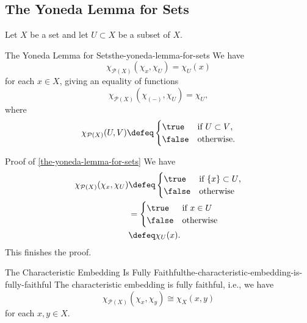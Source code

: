 \subsection{The Yoneda Lemma for Sets}\label{subsection-the-yoneda-lemma-for-sets}
Let $X$ be a set and let $U\subset X$ be a subset of $X$.%
\begin{proposition}{The Yoneda Lemma for Sets}{the-yoneda-lemma-for-sets}%
    We have
    \[
        \chi_{\mathcal{P}(X)}(\chi_{x},\chi_{U})%
        =%
        \chi_{U}(x)%
    \]%
    for each $x\in X$, giving an equality of functions
    \[
        \chi_{\mathcal{P}(X)}(\chi_{(-)},\chi_{U})%
        =%
        \chi_{U},%
    \]%
    where
    \[
        \chi_{\mathcal{P}(X)}(U,V)%
        \defeq%
        \begin{cases}
            \true  &\text{if $U\subset V$,}\\
            \false &\text{otherwise.}
        \end{cases}
    \]%
\end{proposition}
\begin{Proof}{Proof of \cref{the-yoneda-lemma-for-sets}}%
    We have
    \begin{align*}
        \chi_{\mathcal{P}(X)}(\chi_{x},\chi_{U}) &\defeq \begin{cases}
                                                             \true  &\text{if $\{x\}\subset U$,}\\
                                                             \false &\text{otherwise}
                                                         \end{cases}\\
                                                 &=      \begin{cases}
                                                             \true  &\text{if $x\in U$}\\
                                                             \false &\text{otherwise}
                                                         \end{cases}\\
                                                 &\defeq \chi_{U}(x).
    \end{align*}
    This finishes the proof.
\end{Proof}
\begin{corollary}{The Characteristic Embedding Is Fully Faithful}{the-characteristic-embedding-is-fully-faithful}%
    The characteristic embedding is fully faithful, i.e., we have
    \[
        \chi_{\mathcal{P}(X)}(\chi_{x},\chi_{y})%
        \cong%
        \chi_{X}(x,y)
    \]%
    for each $x,y\in X$.
\end{corollary}
